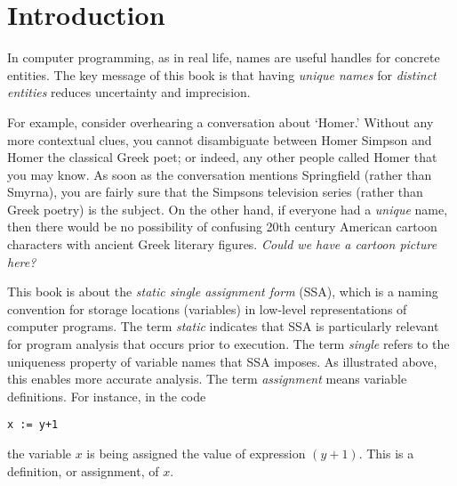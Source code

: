 \chapter{Introduction }




In computer programming, as in real life, 
names are useful handles for concrete entities.
The key message of this book is that
having \textit{unique names} for
\textit{distinct entities}
reduces uncertainty and imprecision.

For example, consider overhearing a conversation
about `Homer.' Without any more contextual clues, you
cannot disambiguate between Homer Simpson and Homer the
classical Greek poet; or indeed, any other people
called Homer that you may know.
As soon as the conversation mentions Springfield
(rather than Smyrna), you are fairly sure that the
Simpsons television series (rather than Greek poetry)
is the subject.
On the other hand, if everyone had a \textit{unique} name,
then there would be no possibility of confusing 20th century
American cartoon characters with ancient Greek literary figures.
\textit{Could we have a cartoon picture here?}

This book is about the \textit{static single assignment form} (SSA),
which is a naming convention for storage locations (variables)
in low-level representations
of computer programs.
The term \textit{static} indicates that SSA is particularly
relevant for program analysis that occurs prior to execution.
The term \textit{single} refers to the uniqueness property of
variable names that SSA imposes. As illustrated above, this enables
more accurate analysis.
The term \textit{assignment} means variable definitions. For
instance, in the code 
\begin{verbatim}
x := y+1
\end{verbatim}
the variable $x$ is being assigned the value of expression $(y+1)$.
This is a definition, or assignment, of $x$.

